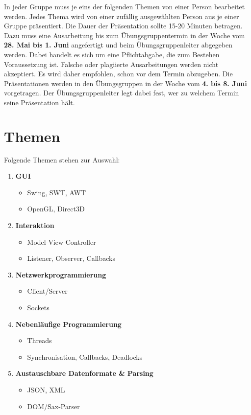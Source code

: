 \documentclass{programmierpraktikum}
\subtitle{Seminarreferate}
\begin{document}
\maketitle
%
In jeder Gruppe muss je eins der folgenden Themen von einer Person be\-ar\-bei\-tet werden. Jedes Thema wird von einer zufällig ausgewählten Person aus je einer Gruppe präsentiert. Die Dauer der Präsentation sollte 15-20 Minuten betragen. Dazu muss eine Ausarbeitung bis zum Übungsgruppentermin in der Woche vom \textbf{28. Mai bis 1. Juni} angefertigt und beim Ü\-bungs\-grup\-pen\-lei\-ter abgegeben werden. Dabei handelt es sich um eine Pflichtabgabe, die zum Bestehen Voraussetzung ist. Falsche oder plagiierte Ausarbeitungen werden nicht akzeptiert. Es wird daher empfohlen, schon vor dem Termin abzugeben. Die Präsentationen werden in den Übungsgruppen in der Woche vom \textbf{4. bis 8. Juni} vorgetragen. Der Übungsgruppenleiter legt dabei fest, wer zu welchem Termin seine Präsentation hält.
%
\section{Themen}
Folgende Themen stehen zur Auswahl:
\begin{enumerate}
  \renewcommand{\labelenumi}{\textbf{\theenumi.}}
  \item \textbf{GUI}
    \begin{itemize}
      \item Swing, SWT, AWT
      \item OpenGL, Direct3D
    \end{itemize}
  \item \textbf{Interaktion}
    \begin{itemize}
      \item Model-View-Controller
      \item Listener, Observer, Callbacks
    \end{itemize}
  \item \textbf{Netzwerkprogrammierung}
    \begin{itemize}
      \item Client/Server
      \item Sockets
    \end{itemize}
  \item \textbf{Nebenläufige Programmierung}
    \begin{itemize}
      \item Threads
      \item Synchronisation, Callbacks, Deadlocks
    \end{itemize}
  \item \textbf{Austauschbare Datenformate \& Parsing}
    \begin{itemize}
      \item JSON, XML
      \item DOM/Sax-Parser
    \end{itemize}
\end{enumerate}
\end{document}
